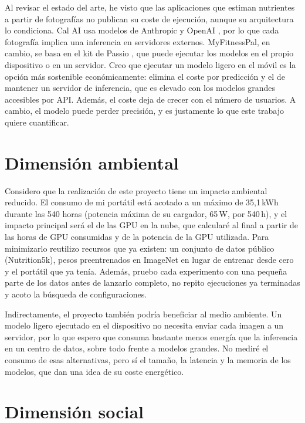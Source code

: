 Al revisar el estado del arte, he visto que las aplicaciones que estiman
nutrientes a partir de fotografías no publican su coste de ejecución, aunque su
arquitectura lo condiciona. Cal AI usa modelos de Anthropic y OpenAI
\citep{PhotoCalorieApp}, por lo que cada fotografía implica una
inferencia en servidores externos. MyFitnessPal, en cambio, se basa en el kit de
Passio \citep{MyFitnessPalNutritionAI}, que puede ejecutar los modelos en el
propio dispositivo \citep{PassioConfigurationClassNutrition_ai} o en un servidor. Creo
que ejecutar un modelo ligero en el móvil es la opción más sostenible
económicamente: elimina el coste por predicción y el de mantener un servidor
de inferencia, que es elevado con los modelos grandes accesibles por API.
Además, el coste deja de crecer con el número de usuarios. A cambio, el modelo
puede perder precisión, y es justamente lo que este trabajo quiere cuantificar.

\section{Dimensión ambiental}

Considero que la realización de este proyecto tiene un impacto ambiental
reducido. El consumo de mi portátil está acotado a un máximo de 35,1\,kWh
durante las 540 horas (potencia máxima de su cargador, 65\,W, por 540\,h), y el impacto principal será el de las GPU en la nube,
que calcularé al final a partir de las horas de GPU consumidas y de la potencia
de la GPU utilizada. Para minimizarlo reutilizo recursos que ya existen: un
conjunto de datos público (Nutrition5k), pesos preentrenados en ImageNet en
lugar de entrenar desde cero y el portátil que ya tenía. Además, pruebo cada
experimento con una pequeña parte de los datos antes de lanzarlo completo, no
repito ejecuciones ya terminadas y acoto la búsqueda de configuraciones.

Indirectamente, el proyecto también podría beneficiar al medio ambiente. Un
modelo ligero ejecutado en el dispositivo no necesita enviar cada imagen a un
servidor, por lo que espero que consuma bastante menos energía que la
inferencia en un centro de datos, sobre todo frente a modelos grandes. No
mediré el consumo de esas alternativas, pero sí el tamaño, la latencia y la
memoria de los modelos, que dan una idea de su coste energético.

\section{Dimensión social}

